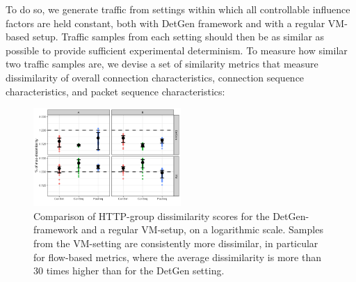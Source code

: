 \documentclass[sigconf]{acmart}
\begin{document}
To do so, we generate traffic from settings within which all controllable influence factors are held constant, both with DetGen framework and with a regular VM-based setup. Traffic samples from each setting should then be as similar as possible to provide sufficient experimental determinism. To measure how similar two traffic samples are, we devise a set of similarity metrics that measure dissimilarity of overall connection characteristics, connection sequence characteristics, and packet sequence characteristics:


\begin{figure}
\centering
\includegraphics[width=0.5\textwidth]{images/Exp1.png}
\caption{Comparison of HTTP-group dissimilarity scores for the DetGen-framework and a regular VM-setup, on a logarithmic scale. Samples from the VM-setting are consistently more dissimilar, in particular for flow-based metrics, where the average dissimilarity is more than 30 times higher than for the DetGen setting.}\label{Fig:determ-metric}
\end{figure}




\end{document}
